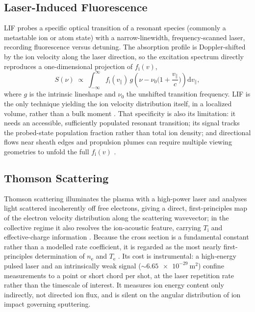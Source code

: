 \subsection{Laser-Induced Fluorescence}

LIF probes a specific optical transition of a resonant species (commonly a metastable ion or atom state) with a narrow-linewidth, frequency-scanned laser, recording fluorescence versus detuning. The absorption profile is Doppler-shifted by the ion velocity along the laser direction, so the excitation spectrum directly reproduces a one-dimensional projection of $f_{\mathrm{i}}(v)$,
\begin{equation}
S(\nu) \;\propto\; \int_{-\infty}^{\infty} f_{\mathrm{i}}(v_{\parallel}) \, g\!\left(\nu - \nu_{0}\Big(1 + \frac{v_{\parallel}}{c}\Big)\right) \mathrm{d}v_{\parallel},
\label{eq:lif_lineshape}
\end{equation}
where $g$ is the intrinsic lineshape and $\nu_{0}$ the unshifted transition frequency. LIF is the only technique yielding the ion velocity distribution itself, in a localized volume, rather than a bulk moment \cite{ref0292}. That specificity is also its limitation: it needs an accessible, sufficiently populated resonant transition; its signal tracks the probed-state population fraction rather than total ion density; and directional flows near sheath edges and propulsion plumes can require multiple viewing geometries to unfold the full $f_{\mathrm{i}}(v)$ \cite{ref0328}.

\subsection{Thomson Scattering}

Thomson scattering illuminates the plasma with a high-power laser and analyses light scattered incoherently off free electrons, giving a direct, first-principles map of the electron velocity distribution along the scattering wavevector; in the collective regime it also resolves the ion-acoustic feature, carrying $T_{\mathrm{i}}$ and effective-charge information \cite{ref0355}. Because the cross section is a fundamental constant rather than a modelled rate coefficient, it is regarded as the most nearly first-principles determination of $n_{\mathrm{e}}$ and $T_{\mathrm{e}}$ \cite{ref0384}. Its cost is instrumental: a high-energy pulsed laser and an intrinsically weak signal ($\sim\SI{6.65e-29}{\meter\squared}$) confine measurements to a point or short chord per shot, at the laser repetition rate rather than the timescale of interest. It measures ion energy content only indirectly, not directed ion flux, and is silent on the angular distribution of ion impact governing sputtering.

